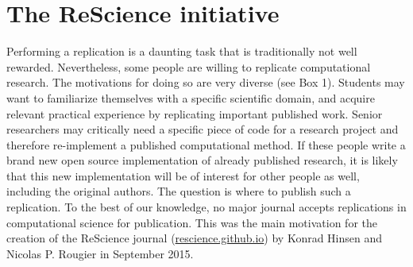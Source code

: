 \documentclass[11pt]{article}
\begin{document}
\section*{The ReScience initiative}

Performing a replication is a daunting task that is traditionally not well
rewarded. Nevertheless, some people are willing to replicate computational
research. The motivations for doing so are very diverse (see Box 1). Students
may want to familiarize themselves with a specific scientific domain, and
acquire relevant practical experience by replicating important published
work. Senior researchers may critically need a specific piece of code for a
research project and therefore re-implement a published computational
method. If these people write a brand new open source implementation of already
published research, it is likely that this new implementation will be of
interest for other people as well, including the original authors. The question
is where to publish such a replication. To the best of our knowledge, no major
journal accepts replications in computational science for publication. This was
the main motivation for the creation of the ReScience journal
(\href{https://rescience.github.io}{rescience.github.io}) by Konrad Hinsen and
Nicolas P. Rougier in September 2015.\\
\end{document}
